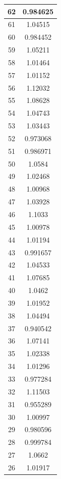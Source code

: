 \begin{table}[h]
\begin{subtable}[h]{2in}
{\begin{tabular}{|c|c|}
62   &   0.984625  \\  \hline  
61   &   1.04515  \\  \hline  
60   &   0.984452  \\  \hline  
59   &   1.05211  \\  \hline  
58   &   1.01464  \\  \hline  
57   &   1.01152  \\  \hline  
56   &   1.12032  \\  \hline  
55   &   1.08628  \\  \hline  
54   &   1.04743  \\  \hline  
53   &   1.03443  \\  \hline  
52   &   0.973068  \\  \hline  
51   &   0.986971  \\  \hline  
50   &   1.0584  \\  \hline  
49   &   1.02468  \\  \hline  
48   &   1.00968  \\  \hline  
47   &   1.03928  \\  \hline  
46   &   1.1033  \\  \hline  
45   &   1.00978  \\  \hline  
44   &   1.01194  \\  \hline  
43   &   0.991657  \\  \hline  
42   &   1.04533  \\  \hline  
41   &   1.07685  \\  \hline  
40   &   1.0462  \\  \hline  
39   &   1.01952  \\  \hline  
38   &   1.04494  \\  \hline  
37   &   0.940542  \\  \hline  
36   &   1.07141  \\  \hline  
35   &   1.02338  \\  \hline  
34   &   1.01296  \\  \hline  
33   &   0.977284  \\  \hline  
32   &   1.11503  \\  \hline  
31   &   0.955289  \\  \hline  
30   &   1.00997  \\  \hline  
29   &   0.980596  \\  \hline  
28   &   0.999784  \\  \hline  
27   &   1.0662  \\  \hline  
26   &   1.01917  \\  \hline  

\end{tabular}}
\end{subtable}
\end{table}

